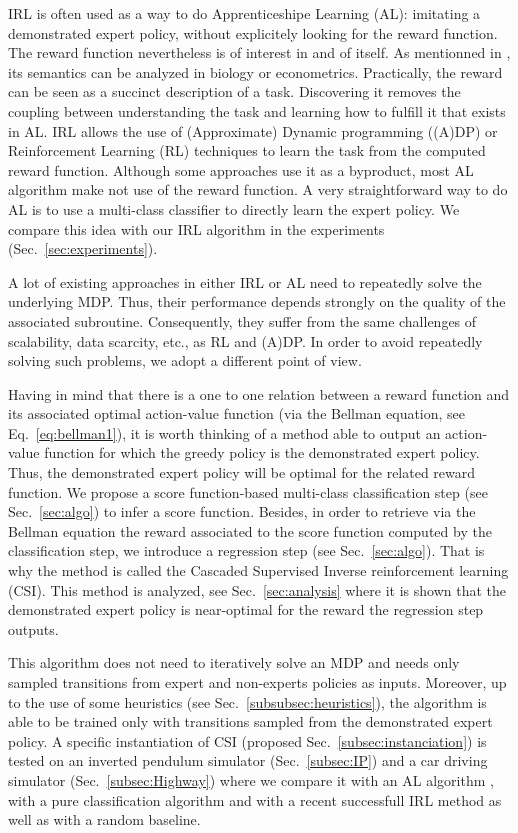 \documentclass[smallextended]{svjour3}
\begin{document}
IRL is often used as a way to do Apprenticeshipe Learning (AL): imitating a demonstrated expert policy, without explicitely looking for the reward function. The reward function nevertheless is of interest in and of itself. As mentionned in \cite{ng2000algorithms}, its semantics can be analyzed in biology or econometrics. Practically, the reward can be seen as a succinct description of a task. Discovering it removes the coupling between understanding the task and learning how to fulfill it that exists in AL. IRL allows the use of (Approximate) Dynamic programming ((A)DP) or Reinforcement Learning (RL) techniques to learn the task from the computed reward function. Although some approaches use it as a byproduct, most AL algorithm make not use of the reward function. A very straightforward way to do AL is to use a multi-class classifier to directly learn the expert policy. We compare this idea with our IRL algorithm in the experiments (Sec.~\ref{sec:experiments}).

A lot of existing approaches in either IRL or AL need to repeatedly solve the underlying MDP. Thus, their performance depends strongly on the quality of the associated subroutine. Consequently, they suffer from the same challenges of scalability, data scarcity, etc., as RL and (A)DP. In order to avoid repeatedly solving such problems, we adopt a different point of view.

Having in mind that there is a one to one relation between a reward function and its associated optimal action-value function (via the Bellman equation, see Eq.~\eqref{eq:bellman1}), it is worth thinking of a method able to output an action-value function for which the greedy policy is the demonstrated expert policy. Thus, the demonstrated expert policy will be optimal for the related reward function. We propose a score function-based multi-class classification step (see Sec.~\ref{sec:algo}) to infer a score function. Besides, in order to retrieve via the Bellman equation the reward associated to the score function computed by the classification step, we introduce a regression step (see Sec.~\ref{sec:algo}). That is why the method is called the Cascaded Supervised Inverse reinforcement learning (CSI). This method is analyzed, see Sec.~\ref{sec:analysis} where it is shown that the demonstrated expert policy is near-optimal for the reward the regression step outputs.

This algorithm does not need to iteratively solve an MDP and needs only sampled transitions from expert and non-experts policies as inputs. Moreover, up to the use of some heuristics (see Sec.~\ref{subsubsec:heuristics}), the algorithm is able to be trained only with transitions sampled from the demonstrated expert policy. A specific instantiation of CSI (proposed Sec.~\ref{subsec:instanciation}) is tested on an inverted pendulum simulator (Sec.~\ref{subsec:IP}) and a car driving simulator (Sec.~\ref{subsec:Highway}) where we compare it with an AL algorithm \cite{abbeel2004apprenticeship}, with a pure classification algorithm \cite{taskar2005learning} and with a recent successfull IRL method \cite{klein2012scirl} as well as with a random baseline.
\end{document}
